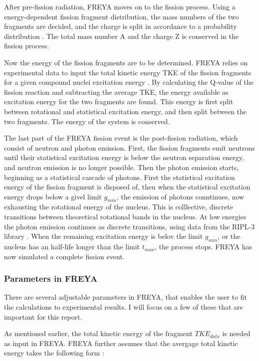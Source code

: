 \documentclass[]{article}
\begin{document}
After pre-fission radiation, FREYA moves on to the fission process. Using a energy-dependent fission fragment distribution, the mass numbers of the two fragments are decided, and the charge is split in accordance to a probability distribution \cite{FREYAusemanual}. The total mass number A and the charge Z is conserved in the fission process.

Now the energy of the fission fragments are to be determined. FREYA relies on experimental data to input the total kinetic energy TKE of the fission fragments for a given compound nuclei excitation energy \cite{FREYAusemanual}. By calculating the Q-value of the fission reaction and subtracting the average TKE, the energy available as excitation energy for the two fragments are found. This energy is first split between rotational and statistical excitation energy, and then split between the two fragments. The energy of the system is conserved. 

The last part of the FREYA fission event is the post-fission radiation, which consist of neutron and photon emission. First, the fission fragments emit neutrons until their statistical excitation energy is below the neutron separation energy, and neutron emission is no longer possible. Then the photon emission starts, beginning as a statistical cascade of photons. First the statistical excitation energy of the fission fragment is disposed of, then when the statistical excitation energy drops below a givel limit $g_{min}$, the emission of photons conntinues, now exhausting the rotational energy of the nucleus. This is colllective, discrete transitions between theoretical rotational bands in the nucleus. At low energies the photon emission continues as discrete transitions, using data from the RIPL-3 library \cite{FREYAusemanual}. When the remaining excitation energy is belov the limit $g_{min}$, or the nucleus has an half-life longer than the limit $t_{max}$, the process stops. FREYA has now simulated a complete fission event.

\subsubsection{Parameters in FREYA}
\label{Parameters_FREYA}
There are several adjustable parameters in FREYA, that enables the user to fit the calculations to experimental results. I will focus on a few of these that are important for this report. 

As mentioned earlier, the total kinetic energy of the fragment $TKE_{data}$ is needed as input in FREYA. FREYA further assumes that the avergage total kinetic energy takes the following form \cite{FREYAusemanual}:
\end{document}
